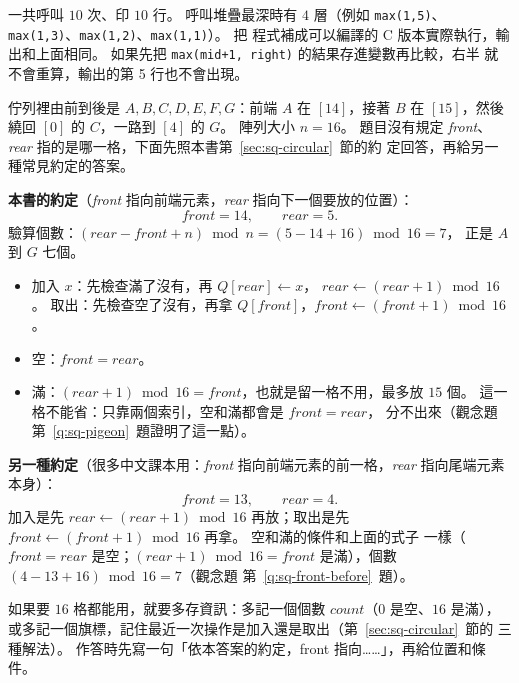 一共呼叫 $10$ 次、印 $10$ 行。 呼叫堆疊最深時有 $4$ 層（例如
\texttt{max(1,5)}、\texttt{max(1,3)}、\texttt{max(1,2)}、\texttt{max(1,1)}）。 把
程式補成可以編譯的 C 版本實際執行，輸出和上面相同。 如果先把 \texttt{max(mid+1, right)} 的結果存進變數再比較，右半
就不會重算，輸出的第 5 行也不會出現。

佇列裡由前到後是 $A, B, C, D, E, F, G$：前端 $A$ 在 $[14]$，接著 $B$ 在 $[15]$，然後
繞回 $[0]$ 的 $C$，一路到 $[4]$ 的 $G$。 陣列大小 $n = 16$。 題目沒有規定
\textit{front}、\textit{rear} 指的是哪一格，下面先照本書第~\ref{sec:sq-circular}~節的約
定回答，再給另一種常見約定的答案。

\textbf{本書的約定}（\textit{front} 指向前端元素，\textit{rear} 指向下一個要放的位置）：
\[
\mathit{front} = 14, \qquad \mathit{rear} = 5 .
\]
驗算個數：$(\mathit{rear} - \mathit{front} + n) \bmod n = (5 - 14 + 16) \bmod 16 = 7$，
正是 $A$ 到 $G$ 七個。
\begin{itemize}
\item 加入 $x$：先檢查滿了沒有，再 $Q[\mathit{rear}] \gets x$，
$\mathit{rear} \gets (\mathit{rear} + 1) \bmod 16$。 取出：先檢查空了沒有，再拿
$Q[\mathit{front}]$，$\mathit{front} \gets (\mathit{front} + 1) \bmod 16$。
\item 空：$\mathit{front} = \mathit{rear}$。
\item 滿：$(\mathit{rear} + 1) \bmod 16 = \mathit{front}$，也就是留一格不用，最多放
$15$ 個。 這一格不能省：只靠兩個索引，空和滿都會是 $\mathit{front} = \mathit{rear}$，
分不出來（觀念題第~\ref{q:sq-pigeon}~題證明了這一點）。
\end{itemize}

\textbf{另一種約定}（很多中文課本用：\textit{front} 指向前端元素的前一格，\textit{rear}
指向尾端元素本身）：
\[
\mathit{front} = 13, \qquad \mathit{rear} = 4 .
\]
加入是先 $\mathit{rear} \gets (\mathit{rear} + 1) \bmod 16$ 再放；取出是先
$\mathit{front} \gets (\mathit{front} + 1) \bmod 16$ 再拿。 空和滿的條件和上面的式子
一樣（$\mathit{front} = \mathit{rear}$ 是空；$(\mathit{rear} + 1) \bmod 16 =
\mathit{front}$ 是滿），個數 $(4 - 13 + 16) \bmod 16 = 7$（觀念題
第~\ref{q:sq-front-before}~題）。

如果要 $16$ 格都能用，就要多存資訊：多記一個個數 $\mathit{count}$（$0$ 是空、$16$
是滿），或多記一個旗標，記住最近一次操作是加入還是取出（第~\ref{sec:sq-circular}~節的
三種解法）。 作答時先寫一句「依本答案的約定，front 指向……」，再給位置和條件。
